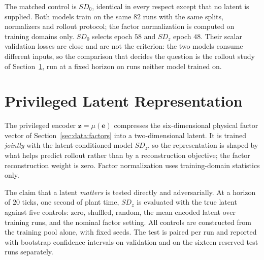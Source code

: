 The matched control is $SD_0$, identical in every respect except that no
latent is supplied. Both models train on the same $82$ runs with the same
splits, normalizers and rollout protocol; the factor normalization is computed
on training domains only. $SD_0$ selects epoch $58$ and $SD_z$ epoch $48$.
Their scalar validation losses are close and are not the criterion: the two
models consume different inputs, so the comparison that decides the question is
the rollout study of Section~\ref{sec:models:latent}, run at a fixed horizon on
runs neither model trained on.


\section{Privileged Latent Representation}
\label{sec:models:latent}
The privileged encoder $\bm{z} = \mu(\bm{e})$ compresses the six-dimensional
physical factor vector of Section~\ref{sec:data:factors} into a
two-dimensional latent. It is trained \emph{jointly} with the
latent-conditioned model $SD_z$, so the representation is shaped by what helps
predict rollout rather than by a reconstruction objective; the factor
reconstruction weight is zero. Factor normalization uses training-domain
statistics only.

The claim that a latent \emph{matters} is tested directly and adversarially.
At a horizon of $20$ ticks, one second of plant time, $SD_z$ is evaluated with
the true latent against five controls: zero, shuffled, random, the mean encoded
latent over training runs, and the nominal factor setting. All controls are
constructed from the training pool alone, with fixed seeds. The test is paired
per run and reported with bootstrap confidence intervals on validation and on
the sixteen reserved test runs separately.

